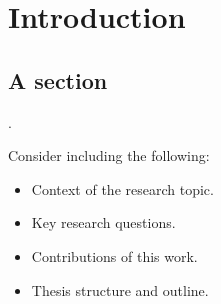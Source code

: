 \documentclass[../../main.tex]{subfiles}
\begin{document}
\chapter{Introduction}
\label{intro:cha:introduction}

\section{A section}%

\cite{smith2024interesting}.

Consider including the following:
\begin{itemize}
	\item Context of the research topic.
	\item Key research questions.
	\item Contributions of this work.
	\item Thesis structure and outline.
\end{itemize}
\end{document}
